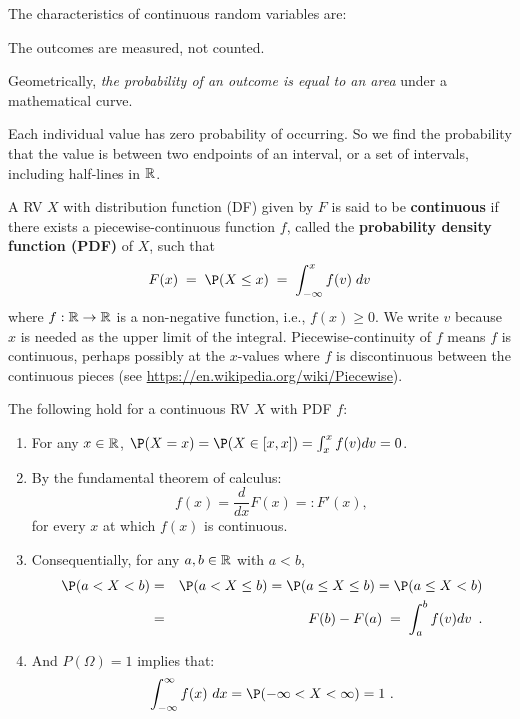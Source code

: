  The characteristics of continuous random variables are:
\bit
\item  The outcomes are measured, not counted.
\item  Geometrically, {\em the probability of an outcome is equal to an area}
  under a mathematical curve.
\item  Each individual value has zero probability of occurring. So we find the probability
      that the value is between two endpoints of an interval, or a set of intervals, including half-lines in $\mathbb{R}$.
\eit

\begin{definition}\label{D:PDF}
A RV $X$ with distribution function (DF) given by $F$ is said to be {\bf continuous} if there exists a piecewise-continuous function $f$, called the {\bf probability density function (PDF)} of $X$, such that 
\begin{equation}\label{eqn:cdf_integral}
F(x)\;=\; \P(X\leq x)\;=\;\int_{-\infty}^x f(v) \;dv
\end{equation}
where $f: \mathbb{R} \to \mathbb{R}$ is a non-negative function, i.e., $f(x)\geq 0$. 
We write $v$ because $x$ is needed as the upper limit of the integral.
Piecewise-continuity of $f$ means $f$ is continuous, perhaps possibly at the $x$-values where $f$ is discontinuous between the continuous pieces (see \url{https://en.wikipedia.org/wiki/Piecewise}). 
\end{definition}

The following hold for a continuous RV $X$ with PDF $f$:
\begin{enumerate}
\item For any $x \in \mathbb{R}$, $\P(X=x)=\P(X \in [x,x]) = \int_x^x f(v)dv = 0$.
\item By the fundamental theorem of calculus:
\begin{equation}\label{eqn:density_dev_cdf}
f(x) = \frac{d}{dx} F(x) =: F'(x), 
\end{equation}
for every $x$ at which $f(x)$ is continuous.
\item Consequentially, for any $a,b \in \mathbb{R}$ with $a<b$,
\begin{eqnarray}\label{eqn:con_intval_prob}
\P(a < X < b ) &=& \P(a < X \leq b) = \P(a \leq X \leq b) = \P(a \leq X < b)\\
               &=& F(b)-F(a)\;=\;\int^b_a f(v)dv\enspace.
\end{eqnarray}
\item And $P(\Omega)=1$ implies that:
\[
\int_{-\infty}^{\infty} f(x) \ dx = \P(-\infty < X < \infty) = 1 \ .
\] 
\end{enumerate}


